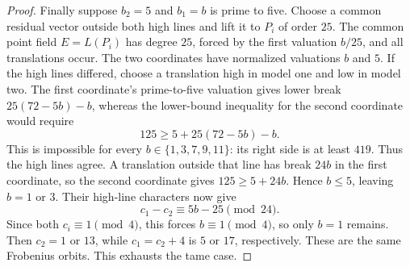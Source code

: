 \begin{proof}
Finally suppose $b_2=5$ and $b_1=b$ is prime to five. Choose a common
residual vector outside both high lines and lift it to $P_i$ of
order $25$. The common point field $E=L(P_i)$ has degree $25$,
forced by the first valuation $b/25$, and all translations occur.
The two coordinates have normalized valuations $b$ and $5$.
If the high lines differed, choose a translation high in model one
and low in model two. The first coordinate's prime-to-five valuation
gives lower break $25(72-5b)-b$, whereas the lower-bound inequality
for the second coordinate would require
\[
                 125\ge5+25(72-5b)-b.                 \tag{B-RD65.5}
\]
This is impossible for every $b\in\{1,3,7,9,11\}$: its right side
is at least $419$.
Thus the high lines agree. A translation outside that line has
break $24b$ in the first coordinate, so the second coordinate gives
$125\ge5+24b$. Hence $b\le5$, leaving $b=1$ or $3$.
Their high-line characters now give
\[
                        c_1-c_2\equiv5b-25\pmod{24}.
                                                        \tag{B-RD65.6}
\]
Since both $c_i\equiv1\pmod4$, this forces $b\equiv1\pmod4$,
so only $b=1$ remains. Then $c_2=1$ or $13$, while
$c_1=c_2+4$ is $5$ or $17$, respectively. These are the same
Frobenius orbits. This exhausts the tame case.
\end{proof}

